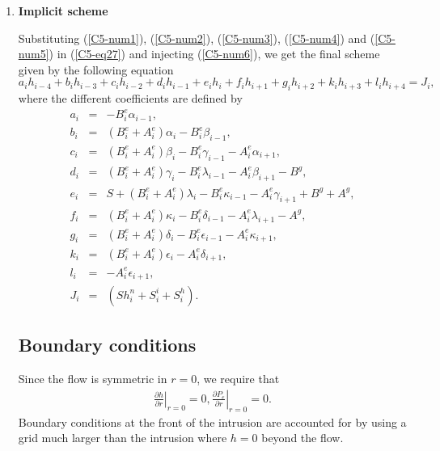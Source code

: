 \begin{enumerate}
 
\item \textbf{Implicit scheme}
 
  Substituting   (\ref{C5-num1}),  (\ref{C5-num2}),   (\ref{C5-num3}),
  (\ref{C5-num4}) and (\ref{C5-num5}) in (\ref{C5-eq27}) and injecting
  (\ref{C5-num6}),  we get  the final  scheme given  by the  following
  equation
  \begin{equation}
    a_ih_{i-4}+b_ih_{i-3}+c_ih_{i-2}+d_ih_{i-1}+e_ih_i+f_ih_{i+1}+g_ih_{i+2}+k_ih_{i+3}+l_ih_{i+4}=J_i,
    \label{C5-eqd3}
  \end{equation}
  where the different coefficients are defined by
  \begin{eqnarray}
    a_i&=&-B_i^{e}\alpha_{i-1} ,\\
    b_i&=&(B_i^{e}+A_i^{e})\alpha_{i}-B_i^{e}\beta_{i-1} ,\\
    c_i&=&(B_i^{e}+A_i^{e})\beta_{i}-B_i^{e}\gamma_{i-1}-A_i^{e}\alpha_{i+1} ,\\
    d_i&=&(B_i^{e}+A_i^{e})\gamma_{i}-B_i^{e}\lambda_{i-1}-A_i^{e}\beta_{i+1} -B^{g},\\
    e_i&=&S+(B_i^{e}+A_i^{e})\lambda_{i}-B_i^{e}\kappa_{i-1}-A_i^{e}\gamma_{i+1} +B^{g}+A^{g},\\
    f_i&=&(B_i^{e}+A_i^{e})\kappa_{i}-B_i^{e}\delta_{i-1}-A_i^{e}\lambda_{i+1} - A^{g},\\
    g_i&=&(B_i^{e}+A_i^{e})\delta_{i}-B_i^{e}\epsilon_{i-1}-A_i^{e}\kappa_{i+1} ,\\
    k_i&=&(B_i^{e}+A_i^{e})\epsilon_{i}-A_i^{e}\delta_{i+1} ,\\
    l_i&=&-A_i^{e}\epsilon_{i+1} ,\\
    J_i&=&(Sh_i^n+ S^{i}_{i}+S^{h}_{i}).
  \end{eqnarray}	
\subsection{Boundary conditions}
	
  Since the flow is symmetric in $r=0$, we require that
  \begin{eqnarray}
    \left.\frac{\partial h}{\partial r}\right|_{r=0}=0,
    \left.\frac{\partial P_{e}}{\partial r}\right|_{r=0}=0.
  \end{eqnarray}
  Boundary conditions at the front  of the intrusion are accounted for
  by using  a grid much larger  than the intrusion where  $h=0$ beyond
  the flow.


\end{enumerate}
